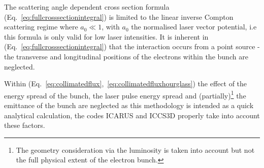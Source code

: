 \documentclass[10pt]{article}
\begin{document}
The scattering angle dependent cross section formula (Eq.~\ref{eq:fullcrosssectionintegral}) is limited to the linear inverse Compton scattering regime where $a_{0} \ll 1$, with $a_{0}$ the normalised laser vector potential, i.e this formula is only valid for low laser intensities. It is inherent in (Eq.~\ref{eq:fullcrosssectionintegral}) that the interaction occurs from a point source - the transverse and longitudinal positions of the electrons within the bunch are neglected. 

Within (Eq.~\ref{eq:collimatedflux},~\ref{eq:collimatedfluxhourglass}) the effect of the energy spread of the bunch, the laser pulse energy spread and (partially)\footnote{The geometry consideration via the luminosity is taken into account but not the full physical extent of the electron bunch.} the emittance of the bunch are neglected as this methodology is intended as a quick analytical calculation, the codes \textsc{ICARUS} and \textsc{ICCS3D} properly take into account these factors.  



\end{document}
